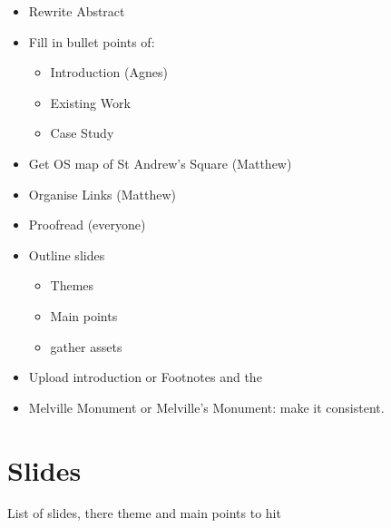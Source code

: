 \documentclass{scrartcl}
\begin{document}
\begin{itemize}
    \item Rewrite Abstract
    \item Fill in bullet points of:
    \begin{itemize}
        \item Introduction (Agnes)
        \item Existing Work
        \item Case Study
    \end{itemize}
    \item Get OS map of St Andrew's Square (Matthew)
    \item Organise Links (Matthew)
    \item Proofread (everyone)    
    \item Outline slides
    \begin{itemize}
        \item Themes
        \item Main points
        \item gather assets
    \end{itemize}
    \item Upload introduction or Footnotes and the
    \item Melville Monument or Melville's Monument: make it consistent.
\end{itemize}

\section{ Slides}

List of slides, there theme and main points to hit
\end{document}
